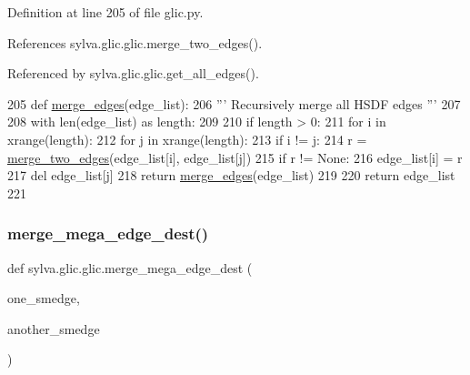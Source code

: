 Definition at line 205 of file glic.\+py.



References sylva.\+glic.\+glic.\+merge\+\_\+two\+\_\+edges().



Referenced by sylva.\+glic.\+glic.\+get\+\_\+all\+\_\+edges().


\begin{DoxyCode}
205     \textcolor{keyword}{def }\hyperlink{namespacesylva_1_1glic_1_1glic_aaac34d7c86749beb842e5be3f547d1ec}{merge\_edges}(edge\_list):
206         \textcolor{stringliteral}{''' Recursively merge all HSDF edges '''}
207 
208         with len(edge\_list) \textcolor{keyword}{as} length:
209 
210             \textcolor{keywordflow}{if} length > 0:
211                 \textcolor{keywordflow}{for} i \textcolor{keywordflow}{in} xrange(length):
212                     \textcolor{keywordflow}{for} j \textcolor{keywordflow}{in} xrange(length):
213                         \textcolor{keywordflow}{if} i != j:
214                             r = \hyperlink{namespacesylva_1_1glic_1_1glic_a3230a4ec28a3787a073288b4532675cc}{merge\_two\_edges}(edge\_list[i], edge\_list[j])
215                             \textcolor{keywordflow}{if} r != \textcolor{keywordtype}{None}:
216                                 edge\_list[i] = r
217                                 del edge\_list[j]
218                                 \textcolor{keywordflow}{return} \hyperlink{namespacesylva_1_1glic_1_1glic_aaac34d7c86749beb842e5be3f547d1ec}{merge\_edges}(edge\_list)
219 
220         \textcolor{keywordflow}{return} edge\_list
221 
\end{DoxyCode}
\mbox{\label{namespacesylva_1_1glic_1_1glic_a80e6906ee9b3a3c96085594f6dab2f84}} 
\subsubsection{\texorpdfstring{merge\+\_\+mega\+\_\+edge\+\_\+dest()}{merge\_mega\_edge\_dest()}}
{\footnotesize\ttfamily def sylva.\+glic.\+glic.\+merge\+\_\+mega\+\_\+edge\+\_\+dest (\begin{DoxyParamCaption}\item[{}]{one\+\_\+smedge,  }\item[{}]{another\+\_\+smedge }\end{DoxyParamCaption})}

